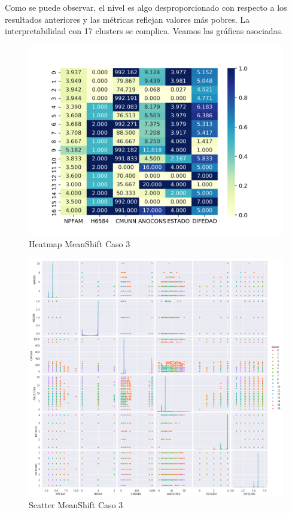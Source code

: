 Como se puede observar, el nivel es algo desproporcionado con respecto a los resultados anteriores y las métricas reflejan valores más pobres. La interpretabilidad con 17 clusters se complica. Veamos las gráficas asociadas.

\begin{figure}[H] %
	\centering
	\includegraphics[scale=0.55]{heatmap-ms3.png}  %
	\caption{Heatmap MeanShift Caso 3} 
	\label{fig:hm-ms-caso3}
\end{figure}

\begin{figure}[H] %
	\centering
	\includegraphics[scale=0.4]{meanshift3.png}  %
	\caption{Scatter MeanShift Caso 3} 
	\label{fig:sc-ms-caso3}
\end{figure}

